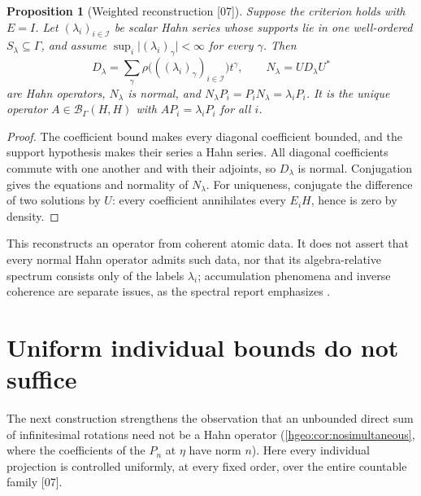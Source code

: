 \documentclass[11pt,letterpaper]{article}
\numberwithin{equation}{section}
\newtheorem{proposition}[proposition]{Proposition}
\theoremstyle{definition}
\theoremstyle{remark}
\newcommand{\BH}{\mathscr B_\Gamma(H,H)}
\newcommand{\abs}[1]{\lvert #1\rvert}
\newcommand{\src}[1]{\textup{\textsf{\small[#1]}}}
\begin{document}
\begin{proposition}[Weighted reconstruction \src{07}]
\label{hgeo:us:prop:weighted}
Suppose the criterion holds with $E=I$. Let $(\lambda_i)_{i\in\mathcal I}$ be
scalar Hahn series whose supports lie in one well-ordered
$S_\lambda\subseteq\Gamma$, and assume
$\sup_i\abs{(\lambda_i)_\gamma}<\infty$ for every $\gamma$. Then
\[
 D_\lambda=\sum_\gamma\rho\bigl(((\lambda_i)_\gamma)_{i\in\mathcal I}\bigr)
 t^\gamma,\qquad N_\lambda=UD_\lambda U^*
\]
are Hahn operators, $N_\lambda$ is normal, and
$N_\lambda P_i=P_iN_\lambda=\lambda_iP_i$. It is the unique operator
$A\in\BH$ with $AP_i=\lambda_iP_i$ for all $i$.
\end{proposition}
\begin{proof}
The coefficient bound makes every diagonal coefficient bounded, and the
support hypothesis makes their series a Hahn series. All diagonal
coefficients commute with one another and with their adjoints, so $D_\lambda$
is normal. Conjugation gives the equations and normality of $N_\lambda$. For
uniqueness, conjugate the difference of two solutions by $U$: every
coefficient annihilates every $E_iH$, hence is zero by density.
\end{proof}

This reconstructs an operator from coherent atomic data. It does not assert
that every normal Hahn operator admits such data, nor that its
algebra-relative spectrum consists only of the labels $\lambda_i$;
accumulation phenomena and inverse coherence are separate issues, as the
spectral report emphasizes \cite{RepoSpectral}.

\section{Uniform individual bounds do not suffice}\label{hgeo:us:sec:uniform}

The next construction strengthens the observation that an unbounded direct
sum of infinitesimal rotations need not be a Hahn operator
(\cref{hgeo:cor:nosimultaneous}, where the coefficients of the $P_n$ at $\eta$
have norm $n$). Here every individual projection is controlled uniformly, at
every fixed order, over the entire countable family \src{07}.
\end{document}
